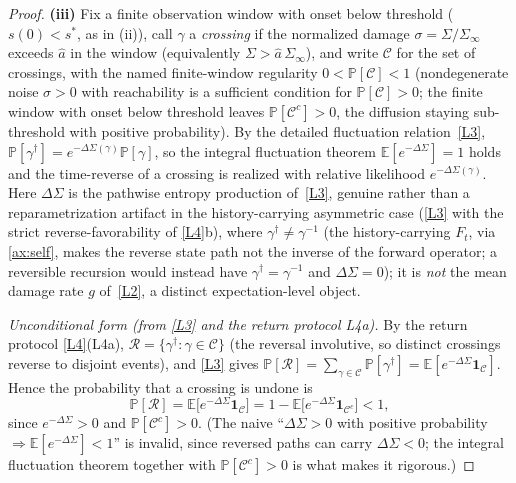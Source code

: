 \documentclass[11pt]{article}
\theoremstyle{plain}
\theoremstyle{definition}
\theoremstyle{remark}
\newcommand{\E}{\mathbb{E}}
\begin{document}
\begin{proof}
\textbf{(iii)} Fix a finite observation window with onset below threshold ($s(0)<s^\ast$, as in (ii)), call $\gamma$ a \emph{crossing} if the normalized damage $\sigma=\Sigma/\Sigma_\infty$ exceeds $\hat a$ in the window (equivalently $\Sigma>\hat a\,\Sigma_\infty$), and write $\mathcal C$ for the set of crossings, with the named finite-window regularity $0<\mathbb P[\mathcal C]<1$ (nondegenerate noise $\sigma>0$ with reachability is a sufficient condition for $\mathbb P[\mathcal C]>0$; the finite window with onset below threshold leaves $\mathbb P[\mathcal C^c]>0$, the diffusion staying sub-threshold with positive probability). By the detailed fluctuation relation~\ref{L3}, $\mathbb P[\gamma^\dagger]=e^{-\Delta\Sigma(\gamma)}\mathbb P[\gamma]$, so the integral fluctuation theorem $\E[e^{-\Delta\Sigma}]=1$ holds \citep{seifert2012} and the time-reverse of a crossing is realized with relative likelihood $e^{-\Delta\Sigma(\gamma)}$. Here $\Delta\Sigma$ is the pathwise entropy production of~\ref{L3}, genuine rather than a reparametrization artifact in the history-carrying asymmetric case (\ref{L3} with the strict reverse-favorability of \ref{L4}b), where $\gamma^\dagger\neq\gamma^{-1}$ (the history-carrying $F_t$, via \ref{ax:self}, makes the reverse state path not the inverse of the forward operator; a reversible recursion would instead have $\gamma^\dagger=\gamma^{-1}$ and $\Delta\Sigma=0$); it is \emph{not} the mean damage rate $g$ of~\ref{L2}, a distinct expectation-level object.

\emph{Unconditional form (from \ref{L3} and the return protocol L4a).} By the return protocol \ref{L4}(L4a), $\mathcal R=\{\gamma^\dagger:\gamma\in\mathcal C\}$ (the reversal involutive, so distinct crossings reverse to disjoint events), and \ref{L3} gives $\mathbb P[\mathcal R]=\sum_{\gamma\in\mathcal C}\mathbb P[\gamma^\dagger]=\E[e^{-\Delta\Sigma}\mathbf 1_{\mathcal C}]$. Hence the probability that a crossing is undone is
\[
\mathbb P[\mathcal R]=\E\!\big[e^{-\Delta\Sigma}\mathbf 1_{\mathcal C}\big]=1-\E\!\big[e^{-\Delta\Sigma}\mathbf 1_{\mathcal C^c}\big]<1,
\]
since $e^{-\Delta\Sigma}>0$ and $\mathbb P[\mathcal C^c]>0$. (The naive ``$\Delta\Sigma>0$ with positive probability $\Rightarrow\E[e^{-\Delta\Sigma}]<1$'' is invalid, since reversed paths can carry $\Delta\Sigma<0$; the integral fluctuation theorem together with $\mathbb P[\mathcal C^c]>0$ is what makes it rigorous.)


\end{proof}
\end{document}
